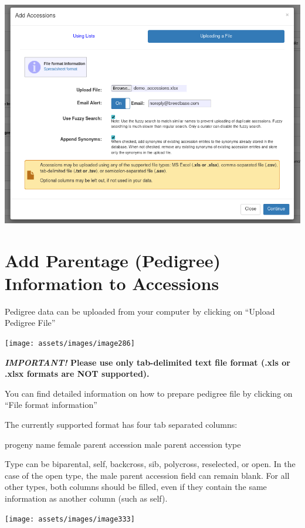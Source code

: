 \documentclass[
  12pt,
]{book}
\begin{document}
\begin{center}\includegraphics[width=0.75\linewidth]{assets/images/accession_upload_using_email} \end{center}

\hypertarget{add-parentage-pedigree-information-to-accessions}{%
\section{Add Parentage (Pedigree) Information to Accessions}\label{add-parentage-pedigree-information-to-accessions}}

Pedigree data can be uploaded from your computer by clicking on ``Upload Pedigree File''

\begin{center}\texttt{[image: assets/images/image286]} \end{center}

\textbf{\emph{IMPORTANT!} Please use only tab-delimited text file format (.xls or .xlsx formats are NOT supported).}

You can find detailed information on how to prepare pedigree file by clicking on ``File format information''

The currently supported format has four tab separated columns:

progeny name female parent accession male parent accession type

Type can be biparental, self, backcross, sib, polycross, reselected, or open. In the case of the open type, the male parent accession field can remain blank. For all other types, both columns should be filled, even if they contain the same information as another column (such as self).

\begin{center}\texttt{[image: assets/images/image333]} \end{center}
\end{document}
